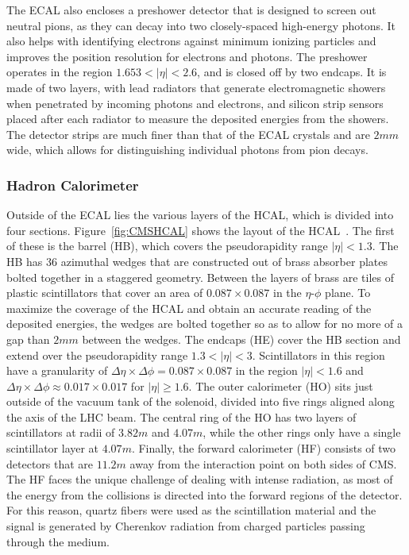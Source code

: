 The ECAL also encloses a preshower detector that is designed to screen out neutral pions, as they can decay into two closely-spaced high-energy photons.
It also helps with identifying electrons against minimum ionizing particles and improves the position resolution for electrons and photons.
The preshower operates in the region $1.653<|\eta|<2.6$, and is closed off by two endcaps.
It is made of two layers, with lead radiators that generate electromagnetic showers when penetrated by incoming photons and electrons, and silicon strip sensors placed after each radiator to measure the deposited energies from the showers.
The detector strips are much finer than that of the ECAL crystals and are $2\unit{mm}$ wide, which allows for distinguishing individual photons from pion decays.

\subsubsection{Hadron Calorimeter}

Outside of the ECAL lies the various layers of the HCAL, which is divided into four sections.
Figure~\ref{fig:CMSHCAL} shows the layout of the HCAL~\cite{Collaboration_2010_HCAL}.
The first of these is the barrel (HB), which covers the pseudorapidity range $|\eta|<1.3$.
The HB has 36 azimuthal wedges that are constructed out of brass absorber plates bolted together in a staggered geometry.
Between the layers of brass are tiles of plastic scintillators that cover an area of $0.087\times0.087$ in the $\eta$-$\phi$ plane.
To maximize the coverage of the HCAL and obtain an accurate reading of the deposited energies, the wedges are bolted together so as to allow for no more of a gap than $2\unit{mm}$ between the wedges.
The endcaps (HE) cover the HB section and extend over the pseudorapidity range $1.3<|\eta|<3$.
Scintillators in this region have a granularity of $\Delta\eta\times\Delta\phi=0.087\times0.087$ in the region $|\eta|<1.6$ and $\Delta\eta\times\Delta\phi\approx0.017\times0.017$ for $|\eta|\geq1.6$.
The outer calorimeter (HO) sits just outside of the vacuum tank of the solenoid, divided into five rings aligned along the axis of the LHC beam.
The central ring of the HO has two layers of scintillators at radii of $3.82\unit{m}$ and $4.07\unit{m}$, while the other rings only have a single scintillator layer at $4.07\unit{m}$.
Finally, the forward calorimeter (HF) consists of two detectors that are $11.2\unit{m}$ away from the interaction point on both sides of CMS.
The HF faces the unique challenge of dealing with intense radiation, as most of the energy from the collisions is directed into the forward regions of the detector.
For this reason, quartz fibers were used as the scintillation material and the signal is generated by Cherenkov radiation from charged particles passing through the medium.


